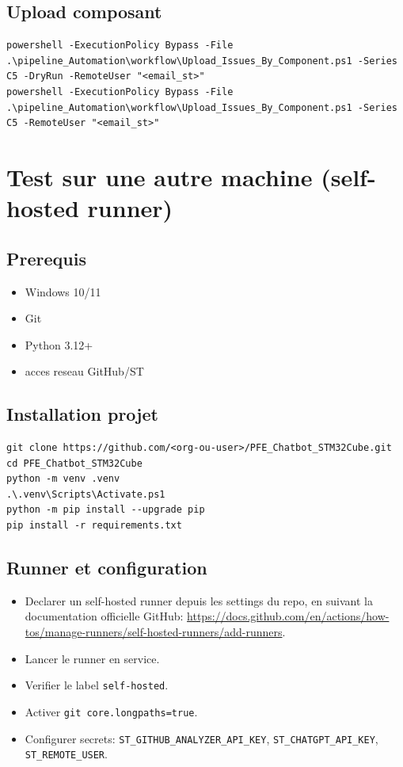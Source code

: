 \documentclass[11pt,a4paper]{article}
\begin{document}
\subsection{Upload composant}
\begin{lstlisting}[style=cmd]
powershell -ExecutionPolicy Bypass -File .\pipeline_Automation\workflow\Upload_Issues_By_Component.ps1 -Series C5 -DryRun -RemoteUser "<email_st>"
powershell -ExecutionPolicy Bypass -File .\pipeline_Automation\workflow\Upload_Issues_By_Component.ps1 -Series C5 -RemoteUser "<email_st>"
\end{lstlisting}

\section{Test sur une autre machine (self-hosted runner)}
\subsection{Prerequis}
\begin{itemize}[leftmargin=*]
  \item Windows 10/11
  \item Git
  \item Python 3.12+
  \item acces reseau GitHub/ST
\end{itemize}

\subsection{Installation projet}
\begin{lstlisting}[style=cmd]
git clone https://github.com/<org-ou-user>/PFE_Chatbot_STM32Cube.git
cd PFE_Chatbot_STM32Cube
python -m venv .venv
.\.venv\Scripts\Activate.ps1
python -m pip install --upgrade pip
pip install -r requirements.txt
\end{lstlisting}

\subsection{Runner et configuration}
\begin{itemize}[leftmargin=*]
  \item Declarer un self-hosted runner depuis les settings du repo, en suivant la
  documentation officielle GitHub: \url{https://docs.github.com/en/actions/how-tos/manage-runners/self-hosted-runners/add-runners}.
  \item Lancer le runner en service.
  \item Verifier le label \texttt{self-hosted}.
  \item Activer \texttt{git core.longpaths=true}.
  \item Configurer secrets: \texttt{ST\_GITHUB\_ANALYZER\_API\_KEY}, \texttt{ST\_CHATGPT\_API\_KEY},
  \texttt{ST\_REMOTE\_USER}.
\end{itemize}
\end{document}
